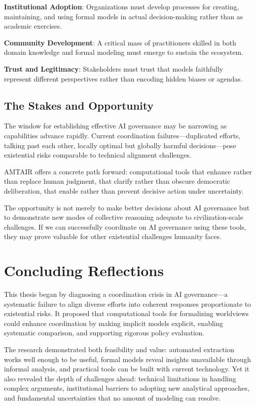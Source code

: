 \documentclass[
  11pt,
  letterpaper,
]{book}
\begin{document}
\textbf{Institutional Adoption}: Organizations must develop processes
for creating, maintaining, and using formal models in actual
decision-making rather than as academic exercises.

\textbf{Community Development}: A critical mass of practitioners skilled
in both domain knowledge and formal modeling must emerge to sustain the
ecosystem.

\textbf{Trust and Legitimacy}: Stakeholders must trust that models
faithfully represent different perspectives rather than encoding hidden
biases or agendas.

\subsection{The Stakes and Opportunity}\label{sec-stakes-opportunity}

The window for establishing effective AI governance may be narrowing as
capabilities advance rapidly. Current coordination failures---duplicated
efforts, talking past each other, locally optimal but globally harmful
decisions---pose existential risks comparable to technical alignment
challenges.

AMTAIR offers a concrete path forward: computational tools that enhance
rather than replace human judgment, that clarify rather than obscure
democratic deliberation, that enable rather than prevent decisive action
under uncertainty.

The opportunity is not merely to make better decisions about AI
governance but to demonstrate new modes of collective reasoning adequate
to civilization-scale challenges. If we can successfully coordinate on
AI governance using these tools, they may prove valuable for other
existential challenges humanity faces.

\section{Concluding Reflections}\label{sec-concluding-reflections}

This thesis began by diagnosing a coordination crisis in AI
governance---a systematic failure to align diverse efforts into coherent
responses proportionate to existential risks. It proposed that
computational tools for formalizing worldviews could enhance
coordination by making implicit models explicit, enabling systematic
comparison, and supporting rigorous policy evaluation.

The research demonstrated both feasibility and value: automated
extraction works well enough to be useful, formal models reveal insights
unavailable through informal analysis, and practical tools can be built
with current technology. Yet it also revealed the depth of challenges
ahead: technical limitations in handling complex arguments,
institutional barriers to adopting new analytical approaches, and
fundamental uncertainties that no amount of modeling can resolve.
\end{document}
